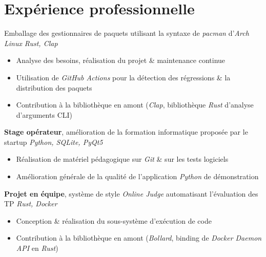 \documentclass{resume}
\begin{document}


\section{Expérience professionnelle}

Emballage des gestionnaires de paquets utilisant la syntaxe de \textit{pacman} d'\textit{Arch Linux} \hfill \textit{Rust, Clap}
\begin{itemize}
  \item Analyse des besoins, réalisation du projet \& maintenance continue
  \item Utilisation de \textit{GitHub Actions} pour la détection des régressions \& la distribution des paquets
  \item Contribution à la bibliothèque en amont (\textit{Clap}, bibliothèque \textit{Rust} d'analyse d'arguments CLI)
\end{itemize}

\textbf{Stage opérateur}, amélioration de la formation informatique proposée par le startup \hfill \textit{Python, SQLite, PyQt5}
\begin{itemize}
  \item Réalisation de matériel pédagogique sur \textit{Git} \& sur les tests logiciels
  \item Amélioration générale de la qualité de l'application \textit{Python} de démonstration
\end{itemize}

\textbf{Projet en équipe}, système de style \textit{Online Judge} automatisant l'évaluation des TP \hfill \textit{Rust, Docker}
\begin{itemize}
  \item Conception \& réalisation du sous-système d'exécution de code
  \item Contribution à la bibliothèque en amont (\textit{Bollard}, binding de \textit{Docker Daemon API} en \textit{Rust})
\end{itemize}
\end{document}
